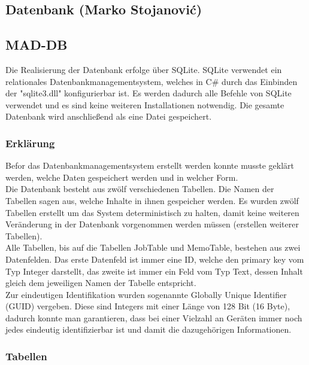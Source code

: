 \documentclass[12pt,a4paper]{report}
\begin{document}
\begin{onehalfspace}
\chapter{Datenbank (Marko Stojanovi\'{c})}

\section{MAD-DB}
Die Realisierung der Datenbank erfolge über SQLite. SQLite verwendet ein relationales Datenbankmanagementsystem, welches in C\# durch das Einbinden der "{}sqlite3.dll"{} konfigurierbar ist. Es werden dadurch alle Befehle von SQLite verwendet und es sind keine weiteren Installationen notwendig. Die gesamte Datenbank wird anschließend als eine Datei gespeichert.

\subsection{Erklärung}
Befor das Datenbankmanagementsystem erstellt werden konnte musste geklärt werden, welche Daten gespeichert werden und in welcher Form.\\

Die Datenbank besteht aus zwölf verschiedenen Tabellen. Die Namen der Tabellen sagen aus, welche Inhalte in ihnen gespeicher werden. Es wurden zwölf Tabellen erstellt um das System deterministisch zu halten, damit keine weiteren Veränderung in der Datenbank vorgenommen werden müssen (erstellen weiterer Tabellen).\\

Alle Tabellen, bis auf die Tabellen JobTable und MemoTable, bestehen aus zwei Datenfelden. Das erste Datenfeld ist immer eine ID, welche den primary key vom Typ Integer darstellt, das zweite ist immer ein Feld vom Typ Text, dessen Inhalt gleich dem jeweiligen Namen der Tabelle entspricht.\\

Zur eindeutigen Identifikation wurden sogenannte Globally Unique Identifier (GUID) vergeben. Diese sind Integers mit einer Länge von 128 Bit (16 Byte), dadurch konnte man garantieren, dass bei einer Vielzahl an Geräten immer noch jedes eindeutig identifizierbar ist und damit die dazugehörigen Informationen.
\subsection{Tabellen}

\end{onehalfspace}
\end{document}
